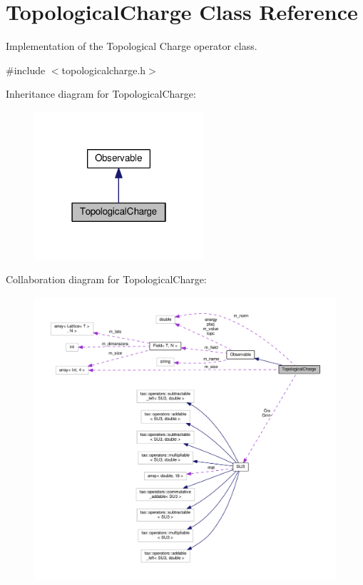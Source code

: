 \hypertarget{classTopologicalCharge}{}\section{Topological\+Charge Class Reference}
\label{classTopologicalCharge}


Implementation of the Topological Charge operator class.  




{\ttfamily \#include $<$topologicalcharge.\+h$>$}



Inheritance diagram for Topological\+Charge\+:\nopagebreak
\begin{figure}[H]
\begin{center}
\leavevmode
\includegraphics[width=178pt]{d6/de5/classTopologicalCharge__inherit__graph}
\end{center}
\end{figure}


Collaboration diagram for Topological\+Charge\+:\nopagebreak
\begin{figure}[H]
\begin{center}
\leavevmode
\includegraphics[width=350pt]{d1/dab/classTopologicalCharge__coll__graph}
\end{center}
\end{figure}
